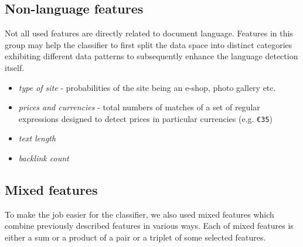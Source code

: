 \documentclass[12pt,a4paper]{article}     %
\begin{document}
  \subsection{Non-language features}
    Not all used features are directly related to document language. Features in this group may help the
    classifier to first split the data space into distinct categories exhibiting different data patterns 
    to subsequently enhance the language detection itself. 

    \begin{itemize}
      \item \textit{type of site} - probabilities of the site being an e-shop, photo gallery etc.
      \item \textit{prices and currencies} - total numbers of matches of a set of regular
      expressions designed to detect prices in particular currencies (e.g. \texttt{\euro 35}) 
      \item \textit{text length} 
      \item \textit{backlink count}
    \end{itemize}
    
  \subsection{Mixed features}

    To make the job easier for the classifier, we also used mixed features which combine previously
    described features in various ways. Each of mixed features is either a sum or a product of a
    pair or a triplet of some selected features.
\end{document}
